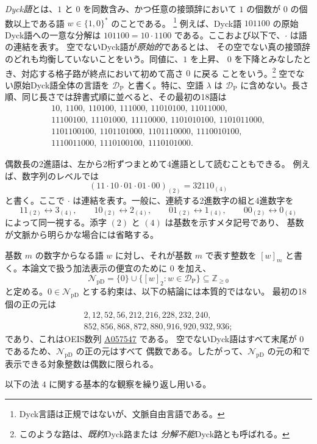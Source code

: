 \documentclass[12pt]{ltjsarticle}
\theoremstyle{plain}
\theoremstyle{definition}
\theoremstyle{plain}
\newcommand{\val}[2]{[#1]_{#2}}
\newcommand{\NpD}{\mathcal{N}_{\mathrm{pD}}}
\newcommand{\DP}{\mathcal{D}_{\mathrm{P}}}
\newcommand{\seqnum}[1]{\href{https://oeis.org/#1}{\textrm{\underline{#1}}}}
\begin{document}
\emph{Dyck語}とは、$1$ と $0$ を同数含み、かつ任意の接頭辞において
$1$ の個数が $0$ の個数以上である語 $w\in\{1,0\}^*$ のことである。
\footnote{Dyck言語は正規ではないが、文脈自由言語である。}
例えば、Dyck語 $101100$ の原始Dyck語への一意な分解は
$101100=10\cdot1100$ である。ここおよび以下で、$\cdot$ は語の連結を表す。
空でないDyck語が\emph{原始的}であるとは、
その空でない真の接頭辞のどれも均衡していないことをいう。同値に、$1$ を上昇、
$0$ を下降とみなしたとき、対応する格子路が終点において初めて高さ $0$ に戻る
ことをいう。\footnote{このような路は、\emph{既約}Dyck路または
\emph{分解不能}Dyck路とも呼ばれる。}
空でない原始Dyck語全体の言語を $\DP$ と書く。特に、空語 $\lambda$ は
$\DP$ に含めない。長さ順、同じ長さでは辞書式順に並べると、その最初の18語は
\[
\begin{gathered}
10,\ 1100,\ 110100,\ 111000,\ 11010100,\ 11011000,\\
11100100,\ 11101000,\ 11110000,\ 1101010100,\ 1101011000,\\
1101100100,\ 1101101000,\ 1101110000,\ 1110010100,\\
1110011000,\ 1110100100,\ 1110101000.
\end{gathered}
\]

偶数長の2進語は、左から2桁ずつまとめて4進語として読むこともできる。
例えば、数字列のレベルでは
\[
 (11\cdot10\cdot01\cdot01\cdot00)_{(2)}=32110_{(4)}
\]
と書く。ここで $\cdot$ は連結を表す。一般に、連続する2進数字の組と4進数字を
\[
 11_{(2)}\longleftrightarrow3_{(4)},\qquad
 10_{(2)}\longleftrightarrow2_{(4)},\qquad
 01_{(2)}\longleftrightarrow1_{(4)},\qquad
 00_{(2)}\longleftrightarrow0_{(4)}
\]
によって同一視する。添字 $(2)$ と $(4)$ は基数を示すメタ記号であり、
基数が文脈から明らかな場合には省略する。

基数 $m$ の数字からなる語 $w$ に対し、それが基数 $m$ で表す整数を
$\val{w}{m}$ と書く。本論文で扱う加法表示の便宜のために $0$ を加え、
\[
 \NpD=\{0\}\cup\{\val{w}{2}:w\in\DP\}
 \subseteq\mathbb Z_{\geq0}
\]
と定める。$0\in\NpD$ とする約束は、以下の結論には本質的ではない。
最初の18個の正の元は
\[
\begin{gathered}
2,12,52,56,212,216,228,232,240,\\
852,856,868,872,880,916,920,932,936;
\end{gathered}
\]
であり、これはOEIS数列 \seqnum{A057547} \cite{OEIS-A057547} である。
空でないDyck語はすべて末尾が $0$ であるため、$\NpD$ の正の元はすべて
偶数である。したがって、$\NpD$ の元の和で表示できる対象整数は偶数に限られる。

以下の法 $4$ に関する基本的な観察を繰り返し用いる。
\end{document}
